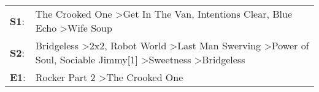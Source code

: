 \begin{supertabular}{p{0.03\textwidth}p{0.92\textwidth}}
 \textbf{S1}:  &                                                                                                                                                        The Crooked One\textsuperscript{} \textgreater \enspace Get In The Van\textsuperscript{}, \enspace Intentions Clear\textsuperscript{}, \enspace Blue Echo\textsuperscript{} \textgreater \enspace Wife Soup\textsuperscript{}  \enspace  \\
 \textbf{S2}:  &  Bridgeless\textsuperscript{} \textgreater \enspace 2x2\textsuperscript{}, \enspace Robot World\textsuperscript{} \textgreater \enspace Last Man Swerving\textsuperscript{} \textgreater \enspace Power of Soul\textsuperscript{}, \enspace Sociable Jimmy[1]\textsuperscript{} \textgreater \enspace Sweetness\textsuperscript{} \textgreater \enspace Bridgeless\textsuperscript{}  \enspace  \\
 \textbf{E1}:  &                                                                                                                                                                                                                                                                                              Rocker Part 2\textsuperscript{} \textgreater \enspace The Crooked One\textsuperscript{}  \enspace  \\
\end{supertabular}
